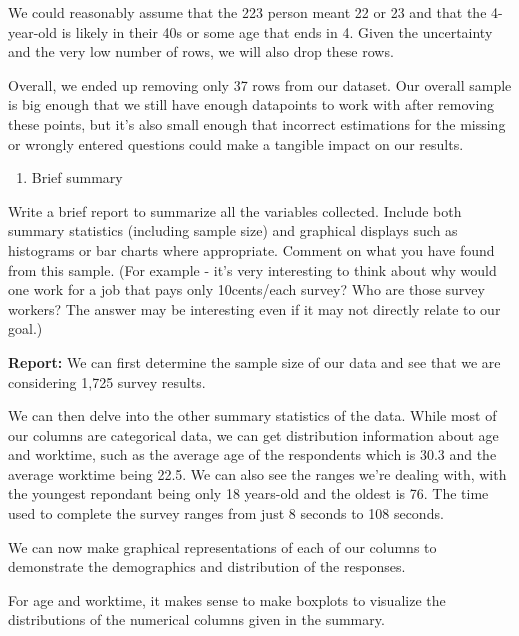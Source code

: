 \documentclass[
]{article}
\providecommand{\tightlist}{%
  \setlength{\itemsep}{0pt}\setlength{\parskip}{0pt}}
\begin{document}
We could reasonably assume that the 223 person meant 22 or 23 and that
the 4-year-old is likely in their 40s or some age that ends in 4. Given
the uncertainty and the very low number of rows, we will also drop these
rows.

Overall, we ended up removing only 37 rows from our dataset. Our overall
sample is big enough that we still have enough datapoints to work with
after removing these points, but it's also small enough that incorrect
estimations for the missing or wrongly entered questions could make a
tangible impact on our results.

\begin{enumerate}
\def\labelenumi{\roman{enumi}.}
\setcounter{enumi}{2}
\tightlist
\item
  Brief summary
\end{enumerate}

Write a brief report to summarize all the variables collected. Include
both summary statistics (including sample size) and graphical displays
such as histograms or bar charts where appropriate. Comment on what you
have found from this sample. (For example - it's very interesting to
think about why would one work for a job that pays only 10cents/each
survey? Who are those survey workers? The answer may be interesting even
if it may not directly relate to our goal.)

\textbf{Report:} We can first determine the sample size of our data and
see that we are considering 1,725 survey results.

We can then delve into the other summary statistics of the data. While
most of our columns are categorical data, we can get distribution
information about age and worktime, such as the average age of the
respondents which is 30.3 and the average worktime being 22.5. We can
also see the ranges we're dealing with, with the youngest repondant
being only 18 years-old and the oldest is 76. The time used to complete
the survey ranges from just 8 seconds to 108 seconds.

We can now make graphical representations of each of our columns to
demonstrate the demographics and distribution of the responses.

For age and worktime, it makes sense to make boxplots to visualize the
distributions of the numerical columns given in the summary.
\end{document}
